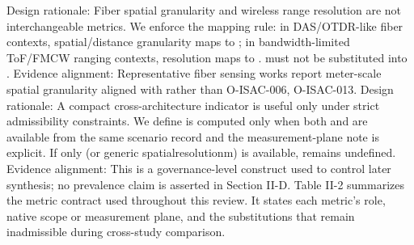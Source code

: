 {}
\markdownRendererSectionEnd \markdownRendererSectionBegin
{}\markdownRendererInterblockSeparator
{}Design rationale: Fiber spatial granularity and wireless range resolution are not interchangeable metrics.\markdownRendererParagraphSeparator
{}We enforce the mapping rule: in DAS/OTDR-like fiber contexts, spatial/distance granularity maps to ; in bandwidth-limited ToF/FMCW ranging contexts, resolution maps to .   must not be substituted into .\markdownRendererParagraphSeparator
{}Evidence alignment: Representative fiber sensing works report meter-scale spatial granularity aligned with  rather than  O-ISAC-006, O-ISAC-013.\markdownRendererInterblockSeparator
{}
\markdownRendererSectionEnd \markdownRendererSectionBegin
{}\markdownRendererInterblockSeparator
{}Design rationale: A compact cross-architecture indicator is useful only under strict admissibility constraints.\markdownRendererParagraphSeparator
{}We define\markdownRendererSoftLineBreak
{}\markdownRendererSoftLineBreak
{} is computed only when both  and  are available from the same scenario record and the measurement-plane note is explicit. If only  (or generic spatial\markdownRendererUnderscore{}resolution\markdownRendererUnderscore{}m) is available,  remains undefined.\markdownRendererParagraphSeparator
{}Evidence alignment: This is a governance-level construct used to control later synthesis; no prevalence claim is asserted in Section II-D.\markdownRendererParagraphSeparator
{}Table II-2 summarizes the metric contract used throughout this review. It states each metric's role, native scope or measurement plane, and the substitutions that remain inadmissible during cross-study comparison.\markdownRendererParagraphSeparator
{}\markdownRendererInterblockSeparator
